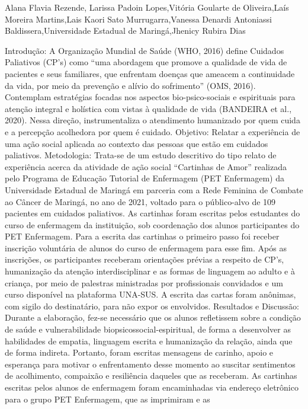 Alana Flavia Rezende, Larissa Padoin Lopes,Vitória Goularte de Oliveira,Laís Moreira Martins,Lais Kaori Sato Murrugarra,Vanessa Denardi Antoniassi Baldissera,Universidade Estadual de Maringá,Jhenicy Rubira Dias

Introdução: A Organização Mundial de Saúde (WHO, 2016) define Cuidados Paliativos (CP’s)
como “uma abordagem que promove a qualidade de vida de pacientes e seus familiares, que
enfrentam doenças que ameacem a continuidade da vida, por meio da prevenção e alívio do
sofrimento” (OMS, 2016). Contemplam estratégias focadas nos aspectos bio-psico-sociais e
espirituais para atenção integral e holística com vistas à qualidade de vida (BANDEIRA et al.,
2020). Nessa direção, instrumentaliza o atendimento humanizado por quem cuida e a percepção
acolhedora por quem é cuidado. Objetivo: Relatar a experiência de uma ação social aplicada ao
contexto das pessoas que estão em cuidados paliativos. Metodologia: Trata-se de um estudo
descritivo do tipo relato de experiência acerca da atividade de ação social “Cartinhas de Amor”
realizada pelo Programa de Educação Tutorial de Enfermagem (PET Enfermagem) da
Universidade Estadual de Maringá em parceria com a Rede Feminina de Combate ao Câncer de
Maringá, no ano de 2021, voltado para o público-alvo de 109 pacientes em cuidados paliativos.
As cartinhas foram escritas pelos estudantes do curso de enfermagem da instituição, sob
coordenação dos alunos participantes do PET Enfermagem. Para a escrita das cartinhas o
primeiro passo foi receber inscrição voluntária de alunos do curso de enfermagem para esse fim.
Após as inscrições, os participantes receberam orientações prévias a respeito de CP’s,
humanização da atenção interdisciplinar e as formas de linguagem ao adulto e à criança, por
meio de palestras ministradas por profissionais convidados e um curso disponível na plataforma
UNA-SUS. A escrita das cartas foram anônimas, com sigilo do destinatário, para não expor os
envolvidos. Resultados e Discussão: Durante a elaboração, fez-se necessário que os alunos
refletissem sobre a condição de saúde e vulnerabilidade biopsicossocial-espiritual, de forma a
desenvolver as habilidades de empatia, linguagem escrita e humanização da relação, ainda que
de forma indireta. Portanto, foram escritas mensagens de carinho, apoio e esperança para motivar
o enfrentamento desse momento ao suscitar sentimentos de acolhimento, compaixão e resiliência
daqueles que as receberam. As cartinhas escritas pelos alunos de enfermagem foram
encaminhadas via endereço eletrônico para o grupo PET Enfermagem, que as imprimiram e as

